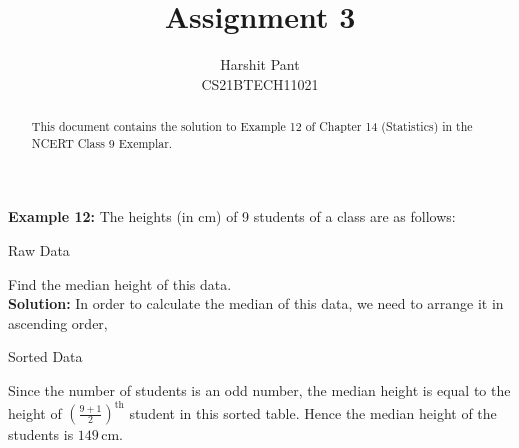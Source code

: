 \documentclass[journal,12pt,twocolumn]{IEEEtran}
\title{Assignment 3}
\author{Harshit Pant\\CS21BTECH11021}
\date{}
\providecommand{\brak}[1]{\ensuremath{\left(#1\right)}}
\begin{document}
\maketitle
\begin{abstract}
This document contains the solution to Example 12 of Chapter 14 (Statistics) in the NCERT Class 9 Exemplar.
\end{abstract}
\textbf{Example 12:}	The heights (in cm) of 9 students of a class are as follows:\\

\begin{table}[!htb]

\caption{Raw Data}
\label{table:raw}
\end{table}
Find the median height of this data.\\

\textbf{Solution: }In order to calculate the median of this data, we need to arrange it in ascending order,\\
\begin{table}[!htb]
\centering

\caption{Sorted Data}
\label{table:sort}
\end{table}

Since the number of students is an odd number, the median height is equal to the height of $\brak{\frac{9+1}{2}}^{\text{th}}$ student in this sorted table.
Hence the median height of the students is $149\,$cm.
\end{document}
